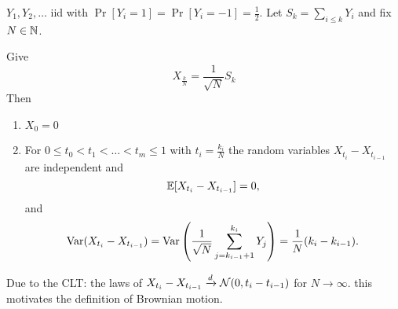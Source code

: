 \documentclass[../chapter01.tex]{subfile}
\begin{document}
$Y_{1}, Y_{2}, \ldots$ iid with $\Pr[Y_{i} = 1] = \Pr[Y_{i}=-1] = \frac{1}{2}$. Let $S_{k} = \sum_{i\le k}Y_{i}$ and fix $N \in \mathbb{N}$. 

Give 
\begin{equation}
X_{\frac{k}{N}} = \frac{1}{\sqrt{N}}S_k
\end{equation}
Then 
\begin{enumerate}
  \item $X_0 = 0$
  \item For $0\le t_0 < t_1 < \ldots < t_m \le 1$ with $t_i = \frac{k_i}{N}$ the random variables $X_{t_i} - X_{t_{i-1}}$
    are independent and 
    \begin{equation}
      \mathbb{E}[X_{t_i} - X_{t_{i-1}}] = 0,
    \end{equation} and 
    \begin{equation}
      \operatorname{Var}(X_{t_i}-X_{t_{i-1}}) = \operatorname{Var}\left(\frac{1}{\sqrt{N}}\sum_{j={k_{i-1}+1}}^{k_{i}}Y_{j}\right) = \frac{1}{N}(k_{i}-k_{i-1}).
    \end{equation}
\end{enumerate}
Due to the CLT: the laws of $X_{t_i}-X_{t_{i-1}} \xrightarrow{d}\mathcal{N}(0, t_{i}-t_{i-1})$ for $N\to \infty$.
this motivates the definition of Brownian motion.
\end{document}
